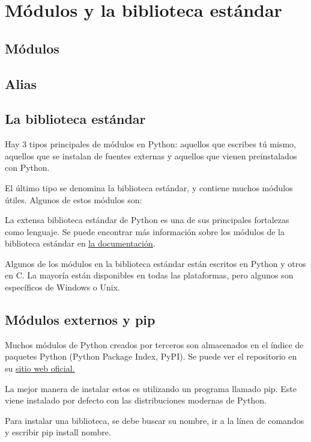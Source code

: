 \documentclass{report}
\begin{document}
\clearpage\chapter{Módulos y la biblioteca estándar}

\section{Módulos}

\section{Alias}

\section{La biblioteca estándar}

Hay 3 tipos principales de módulos en Python: aquellos que escribes tú mismo, aquellos que se instalan de fuentes externas y aquellos que vienen preinstalados con Python.

El último tipo se denomina la biblioteca estándar, y contiene muchos módulos útiles. Algunos de estos módulos son:


La extensa biblioteca estándar de Python es una de sus principales fortalezas como lenguaje. Se puede encontrar más información sobre los módulos de la biblioteca estándar en \href{https://docs.python.org/3/library/index.html}{\underline{la documentación}}.

Algunos de los módulos en la biblioteca estándar están escritos en Python y otros en C. La mayoría están disponibles en todas las plataformas, pero algunos son específicos de Windows o Unix.

\section{Módulos externos y pip}

Muchos módulos de Python creados por terceros son almacenados en el índice de paquetes Python (Python Package Index, PyPI). Se puede ver el repositorio en su \href{https://pypi.org}{\underline{sitio web oficial.}}

La mejor manera de instalar estos es utilizando un programa llamado pip. Este viene instalado por defecto con las distribuciones modernas de Python.

Para instalar una biblioteca, se debe buscar su nombre, ir a la línea de comandos y escribir pip install nombre.
\end{document}
